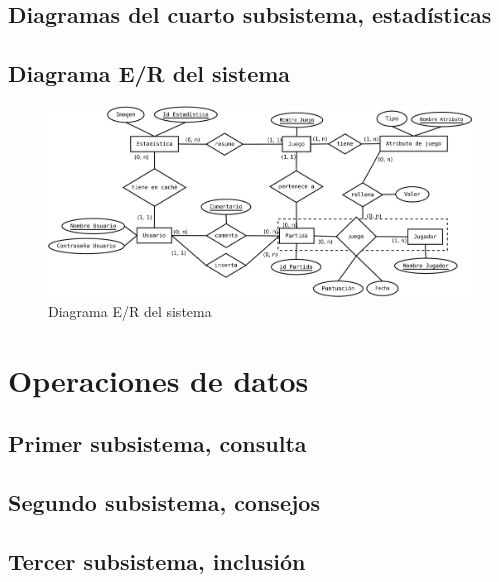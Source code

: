 \documentclass[a4paper, 11pt]{article}
\begin{document}


\newpage

\subsection{Diagramas del cuarto subsistema, estadísticas}


\newpage

\subsection{Diagrama E/R del sistema}

\begin{figure}[H]
\centering
\includegraphics[width=0.9\linewidth]{../Diagramas/pdf/ER.pdf}
\caption{Diagrama E/R del sistema}
\end{figure}

\newpage
\section{Operaciones de datos}

\subsection{Primer subsistema, consulta}


\subsection{Segundo subsistema, consejos}


\subsection{ Tercer subsistema, inclusión}

\end{document}
